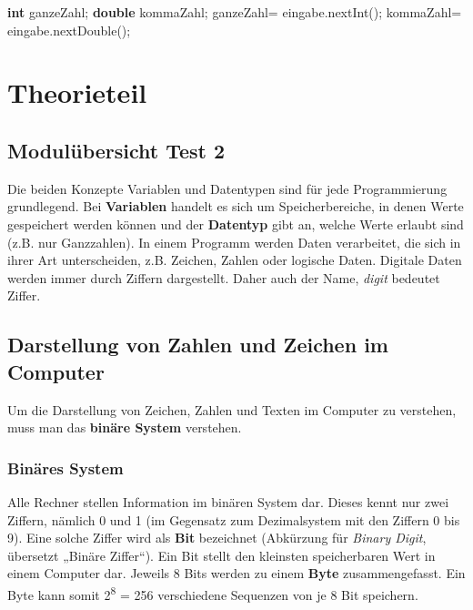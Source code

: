 \documentclass[10pt,paper=17cm:22cm, twoside=true, DIV=14]{scrbook}
\newenvironment {Shaded}
        {\begin{mdframed}[style=code] }
         {\end{mdframed}}
\newcommand{\DataTypeTok}[1]{\textcolor[rgb]{0.1,0.1,0.1}{\textbf{#1}}}
\newcommand{\FunctionTok}[1]{\textcolor[rgb]{0.2,0.2,0.2}{#1}}
\newcommand{\NormalTok}[1]{#1}
\begin{document}
\begin{Shaded}
\begin{Highlighting}[]
\DataTypeTok{int} \NormalTok{ganzeZahl;}
\DataTypeTok{double} \NormalTok{kommaZahl;}
\NormalTok{ganzeZahl= eingabe.}\FunctionTok{nextInt}\NormalTok{();}
\NormalTok{kommaZahl= eingabe.}\FunctionTok{nextDouble}\NormalTok{();}
\end{Highlighting}
\end{Shaded}

\clearpage \begingroup \let\clearpage\relax \let\cleardoublepage\relax \chapter{ Theorieteil } \endgroup 

\section{Modulübersicht Test 2}\label{modulubersicht-test-2-1}

Die beiden Konzepte Variablen und Datentypen sind für jede
Programmierung grundlegend. Bei \textbf{Variablen} handelt es sich um
Speicherbereiche, in denen Werte gespeichert werden können und der
\textbf{Datentyp} gibt an, welche Werte erlaubt sind (z.B. nur
Ganzzahlen). In einem Programm werden Daten verarbeitet, die sich in
ihrer Art unterscheiden, z.B. Zeichen, Zahlen oder logische Daten.
Digitale Daten werden immer durch Ziffern dargestellt. Daher auch der
Name, \emph{digit} bedeutet Ziffer.

\section{Darstellung von Zahlen und Zeichen im
Computer}\label{darstellung-von-zahlen-und-zeichen-im-computer-1}

Um die Darstellung von Zeichen, Zahlen und Texten im Computer zu
verstehen, muss man das \textbf{binäre System} verstehen.

\subsection{Binäres System}\label{binares-system-1}

Alle Rechner stellen Information im binären System dar. Dieses kennt nur
zwei Ziffern, nämlich 0 und 1 (im Gegensatz zum Dezimalsystem mit den
Ziffern 0 bis 9). Eine solche Ziffer wird als \textbf{Bit} bezeichnet
(Abkürzung für \emph{Binary Digit}, übersetzt „Binäre Ziffer``). Ein Bit
stellt den kleinsten speicherbaren Wert in einem Computer dar. Jeweils 8
Bits werden zu einem \textbf{Byte} zusammengefasst. Ein Byte kann somit
2\textsuperscript{8} = 256 verschiedene Sequenzen von je 8 Bit
speichern.
\end{document}
